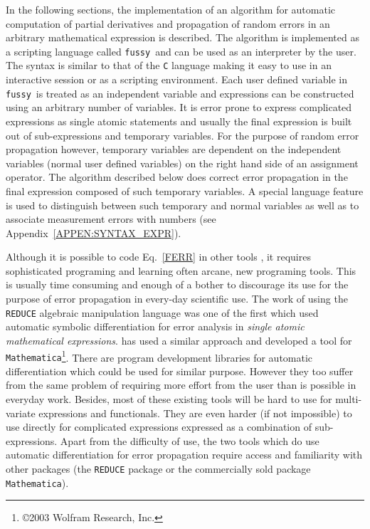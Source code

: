 \documentclass[12pt]{article}
\newcommand{\Fussy}{{\tt fussy}}
\begin{document}
In the following sections, the implementation of an algorithm for
automatic computation of partial derivatives and propagation of random
errors in an arbitrary mathematical expression is described.  The
algorithm is implemented as a scripting language called \Fussy\ and
can be used as an interpreter by the user.  The syntax is similar to
that of the {\tt C} language making it easy to use in an interactive
session or as a scripting environment.  Each user defined variable in
\Fussy\ is treated as an independent variable and expressions can be
constructed using an arbitrary number of variables.  It is error prone
to express complicated expressions as single atomic statements and
usually the final expression is built out of sub-expressions and
temporary variables.  For the purpose of random error propagation
however, temporary variables are dependent on the independent
variables (normal user defined variables) on the right hand side of an
assignment operator.  The algorithm described below does correct error
propagation in the final expression composed of such temporary
variables.  A special language feature is used to distinguish between
such temporary and normal variables as well as to associate
measurement errors with numbers (see
Appendix~\ref{APPEN:SYNTAX_EXPR}).

Although it is possible to code Eq.~\ref{FERR} in other tools
\citep{Calc,EDA,Bischof1997A-A}, it requires sophisticated programing
and learning often arcane, new programing tools.  This is usually time
consuming and enough of a bother to discourage its use for the purpose
of error propagation in every-day scientific use.  The work of
\citet{Stoutemyer:1977} using the {\tt REDUCE} algebraic manipulation
language \citep{REDUCE2,REDUCE} was one of the first which used
automatic symbolic differentiation for error analysis in {\it single
  atomic mathematical expressions}.  \citet{EDA} has used a similar
approach and developed a tool for {\tt
  Mathematica}\footnote{\copyright 2003 Wolfram Research, Inc.}.
There are program development libraries
\citep{ScComp,Griewank:1996:AAP,Tsukanov2003Dsa} for automatic
differentiation which could be used for similar purpose.  However they
too suffer from the same problem of requiring more effort from the
user than is possible in everyday work.  Besides, most of these
existing tools will be hard to use for multi-variate expressions and
functionals.  They are even harder (if not impossible) to use directly
for complicated expressions expressed as a combination of
sub-expressions.  Apart from the difficulty of use, the two tools
which do use automatic differentiation for error propagation require
access and familiarity with other packages (the {\tt REDUCE} package
or the commercially sold package {\tt Mathematica}).
\end{document}
